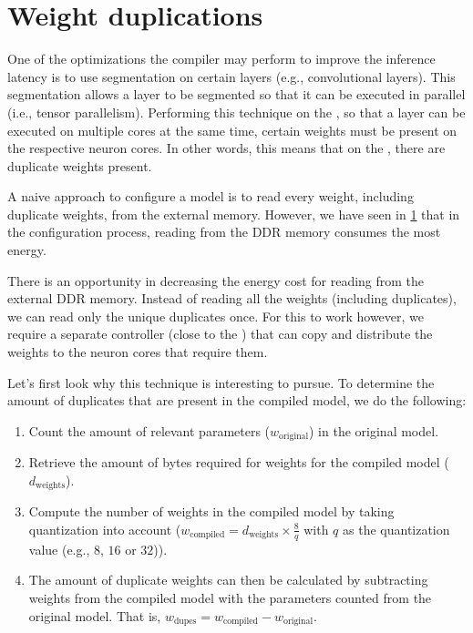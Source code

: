 \section{Weight duplications}
One of the optimizations the compiler may perform to improve the inference latency is to use segmentation on certain layers (e.g., convolutional layers).
This segmentation allows a layer to be segmented so that it can be executed in parallel (i.e., tensor parallelism).
Performing this technique on the \graicore{}, so that a layer can be executed on multiple cores at the same time, certain weights must be present on the respective neuron cores.
In other words, this means that on the \graicore{}, there are duplicate weights present.

A naive approach to configure a model is to read every weight, including duplicate weights, from the external memory.
However, we have seen in \ref{} that in the configuration process, reading from the DDR memory consumes the most energy.

There is an opportunity in decreasing the energy cost for reading from the external DDR memory.
Instead of reading all the weights (including duplicates), we can read only the unique duplicates once.
For this to work however, we require a separate controller (close to the \graicore{}) that can copy and distribute the weights to the neuron cores that require them.

Let's first look why this technique is interesting to pursue.
To determine the amount of duplicates that are present in the compiled model, we do the following:
\begin{enumerate}
    \item
    Count the amount of relevant parameters ($w_
    \textrm{original}$) in the original model.
    \item
    Retrieve the amount of bytes required for weights for the compiled model ($d_\textrm{weights}$).
    \item
    Compute the number of weights in the compiled model by taking quantization into account ($w_\textrm{compiled} = d_\textrm{weights} \times \frac{8}{q}$ with $q$ as the quantization value (e.g., $8$, $16$ or $32$)).
    \item  
    The amount of duplicate weights can then be calculated by subtracting weights from the compiled model with the parameters counted from the original model. That is, $w_\textrm{dupes} = w_\textrm{compiled} - w_\textrm{original}$.
\end{enumerate}

